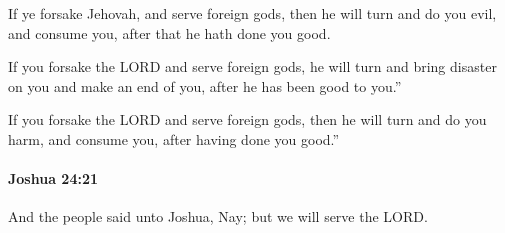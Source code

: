 			\begin{versebox}
					\item[BHS] 
					\item[ASV] If ye forsake Jehovah, and serve foreign gods, then he will turn and do you evil, and consume you, after that he hath done you good.
					\item[NIV] If you forsake the LORD and serve foreign gods, he will turn and bring disaster on you and make an end of you, after he has been good to you.”
					\item[NRSV] If you forsake the LORD and serve foreign gods, then he will turn and do you harm, and consume you, after having done you good.”
			\end{versebox}

		\paragraph{Joshua 24:21} %
			\label{JOSHUA-24-21}

			And the people said unto Joshua, Nay; but we will serve the LORD.

